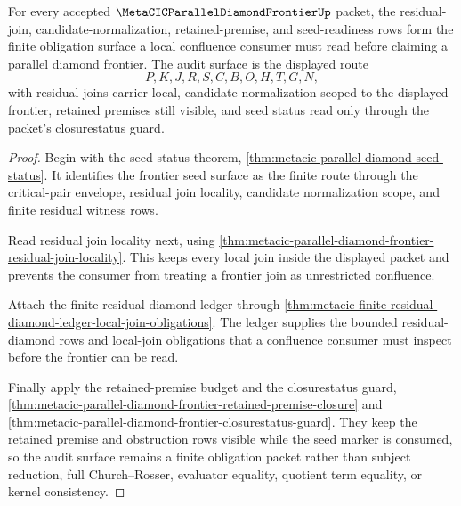 \begin{theorem}
\label{thm:metacic-parallel-diamond-frontier-obligation-closure-audit}
For every accepted $\MetaCICParallelDiamondFrontierUp$ packet, the residual-join, candidate-normalization, retained-premise, and seed-readiness rows form the finite obligation surface a local confluence consumer must read before claiming a parallel diamond frontier. The audit surface is the displayed route
$$
P,K,J,R,S,C,B,O,H,T,G,N ,
$$
with residual joins carrier-local, candidate normalization scoped to the displayed frontier, retained premises still visible, and seed status read only through the packet's closurestatus guard.
\end{theorem}
\begin{proof}
Begin with the seed status theorem, \autoref{thm:metacic-parallel-diamond-seed-status}. It identifies the frontier seed surface as the finite route through the critical-pair envelope, residual join locality, candidate normalization scope, and finite residual witness rows.

Read residual join locality next, using \autoref{thm:metacic-parallel-diamond-frontier-residual-join-locality}. This keeps every local join inside the displayed packet and prevents the consumer from treating a frontier join as unrestricted confluence.

Attach the finite residual diamond ledger through \autoref{thm:metacic-finite-residual-diamond-ledger-local-join-obligations}. The ledger supplies the bounded residual-diamond rows and local-join obligations that a confluence consumer must inspect before the frontier can be read.

Finally apply the retained-premise budget and the closurestatus guard, \autoref{thm:metacic-parallel-diamond-frontier-retained-premise-closure} and \autoref{thm:metacic-parallel-diamond-frontier-closurestatus-guard}. They keep the retained premise and obstruction rows visible while the seed marker is consumed, so the audit surface remains a finite obligation packet rather than subject reduction, full Church--Rosser, evaluator equality, quotient term equality, or kernel consistency.
\end{proof}
